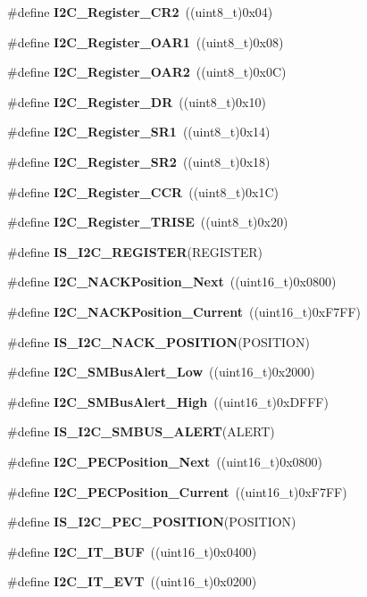 \begin{DoxyCompactItemize}
\item 
\#define \textbf{ I2\+C\+\_\+\+Register\+\_\+\+C\+R2}~((uint8\+\_\+t)0x04)
\item 
\#define \textbf{ I2\+C\+\_\+\+Register\+\_\+\+O\+A\+R1}~((uint8\+\_\+t)0x08)
\item 
\#define \textbf{ I2\+C\+\_\+\+Register\+\_\+\+O\+A\+R2}~((uint8\+\_\+t)0x0\+C)
\item 
\#define \textbf{ I2\+C\+\_\+\+Register\+\_\+\+DR}~((uint8\+\_\+t)0x10)
\item 
\#define \textbf{ I2\+C\+\_\+\+Register\+\_\+\+S\+R1}~((uint8\+\_\+t)0x14)
\item 
\#define \textbf{ I2\+C\+\_\+\+Register\+\_\+\+S\+R2}~((uint8\+\_\+t)0x18)
\item 
\#define \textbf{ I2\+C\+\_\+\+Register\+\_\+\+C\+CR}~((uint8\+\_\+t)0x1\+C)
\item 
\#define \textbf{ I2\+C\+\_\+\+Register\+\_\+\+T\+R\+I\+SE}~((uint8\+\_\+t)0x20)
\item 
\#define \textbf{ I\+S\+\_\+\+I2\+C\+\_\+\+R\+E\+G\+I\+S\+T\+ER}(R\+E\+G\+I\+S\+T\+ER)
\item 
\#define \textbf{ I2\+C\+\_\+\+N\+A\+C\+K\+Position\+\_\+\+Next}~((uint16\+\_\+t)0x0800)
\item 
\#define \textbf{ I2\+C\+\_\+\+N\+A\+C\+K\+Position\+\_\+\+Current}~((uint16\+\_\+t)0x\+F7\+F\+F)
\item 
\#define \textbf{ I\+S\+\_\+\+I2\+C\+\_\+\+N\+A\+C\+K\+\_\+\+P\+O\+S\+I\+T\+I\+ON}(P\+O\+S\+I\+T\+I\+ON)
\item 
\#define \textbf{ I2\+C\+\_\+\+S\+M\+Bus\+Alert\+\_\+\+Low}~((uint16\+\_\+t)0x2000)
\item 
\#define \textbf{ I2\+C\+\_\+\+S\+M\+Bus\+Alert\+\_\+\+High}~((uint16\+\_\+t)0x\+D\+F\+F\+F)
\item 
\#define \textbf{ I\+S\+\_\+\+I2\+C\+\_\+\+S\+M\+B\+U\+S\+\_\+\+A\+L\+E\+RT}(A\+L\+E\+RT)
\item 
\#define \textbf{ I2\+C\+\_\+\+P\+E\+C\+Position\+\_\+\+Next}~((uint16\+\_\+t)0x0800)
\item 
\#define \textbf{ I2\+C\+\_\+\+P\+E\+C\+Position\+\_\+\+Current}~((uint16\+\_\+t)0x\+F7\+F\+F)
\item 
\#define \textbf{ I\+S\+\_\+\+I2\+C\+\_\+\+P\+E\+C\+\_\+\+P\+O\+S\+I\+T\+I\+ON}(P\+O\+S\+I\+T\+I\+ON)
\item 
\#define \textbf{ I2\+C\+\_\+\+I\+T\+\_\+\+B\+UF}~((uint16\+\_\+t)0x0400)
\item 
\#define \textbf{ I2\+C\+\_\+\+I\+T\+\_\+\+E\+VT}~((uint16\+\_\+t)0x0200)

\end{DoxyCompactItemize}
